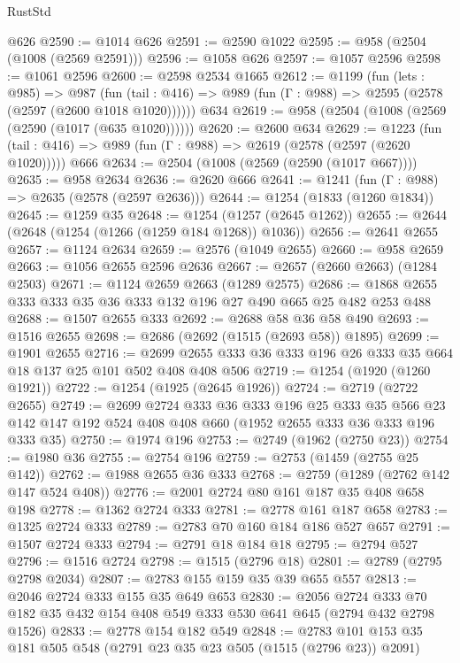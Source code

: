 \begin{lexlean}{RustStd}
\begin{coremodule}
    @626
@2590 := @1014 @626
@2591 := @2590 @1022
@2595 := @958 (@2504 (@1008 (@2569 @2591)))
@2596 := @1058 @626
@2597 := @1057 @2596
@2598 := @1061 @2596
@2600 := @2598 @2534 @1665
@2612 := @1199
    (fun (lets : @985) =>
    @987 (fun (tail : @416) => @989 (fun (Γ : @988) => @2595 (@2578 (@2597 (@2600 @1018 @1020))))))
    @634
@2619 := @958 (@2504 (@1008 (@2569 (@2590 (@1017 (@635 @1020))))))
@2620 := @2600 @634
@2629 := @1223
    (fun (tail : @416) => @989 (fun (Γ : @988) => @2619 (@2578 (@2597 (@2620 @1020)))))
    @666
@2634 := @2504 (@1008 (@2569 (@2590 (@1017 @667))))
@2635 := @958 @2634
@2636 := @2620 @666
@2641 := @1241 (fun (Γ : @988) => @2635 (@2578 (@2597 @2636)))
@2644 := @1254 (@1833 (@1260 @1834))
@2645 := @1259 @35
@2648 := @1254 (@1257 (@2645 @1262))
@2655 := @2644 (@2648 (@1254 (@1266 (@1259 @184 @1268)) @1036))
@2656 := @2641 @2655
@2657 := @1124 @2634
@2659 := @2576 (@1049 @2655)
@2660 := @958 @2659
@2663 := @1056 @2655 @2596 @2636
@2667 := @2657 (@2660 @2663) (@1284 @2503)
@2671 := @1124 @2659 @2663 (@1289 @2575)
@2686 := @1868 @2655 @333 @333 @35 @36 @333 @132 @196 @27 @490 @665 @25 @482 @253 @488
@2688 := @1507 @2655 @333
@2692 := @2688 @58 @36 @58 @490
@2693 := @1516 @2655
@2698 := @2686 (@2692 (@1515 (@2693 @58)) @1895)
@2699 := @1901 @2655
@2716 := @2699 @2655 @333 @36 @333 @196 @26 @333 @35 @664 @18 @137 @25 @101 @502 @408 @408 @506
@2719 := @1254 (@1920 (@1260 @1921))
@2722 := @1254 (@1925 (@2645 @1926))
@2724 := @2719 (@2722 @2655)
@2749 := @2699
    @2724
    @333
    @36
    @333
    @196
    @25
    @333
    @35
    @566
    @23
    @142
    @147
    @192
    @524
    @408
    @408
    @660
    (@1952 @2655 @333 @36 @333 @196 @333 @35)
@2750 := @1974 @196
@2753 := @2749 (@1962 (@2750 @23))
@2754 := @1980 @36
@2755 := @2754 @196
@2759 := @2753 (@1459 (@2755 @25 @142))
@2762 := @1988 @2655 @36 @333
@2768 := @2759 (@1289 (@2762 @142 @147 @524 @408))
@2776 := @2001 @2724 @80 @161 @187 @35 @408 @658 @198
@2778 := @1362 @2724 @333
@2781 := @2778 @161 @187 @658
@2783 := @1325 @2724 @333
@2789 := @2783 @70 @160 @184 @186 @527 @657
@2791 := @1507 @2724 @333
@2794 := @2791 @18 @184 @18
@2795 := @2794 @527
@2796 := @1516 @2724
@2798 := @1515 (@2796 @18)
@2801 := @2789 (@2795 @2798 @2034)
@2807 := @2783 @155 @159 @35 @39 @655 @557
@2813 := @2046 @2724 @333 @155 @35 @649 @653
@2830 := @2056
    @2724
    @333
    @70
    @182
    @35
    @432
    @154
    @408
    @549
    @333
    @530
    @641
    @645
    (@2794 @432 @2798 @1526)
@2833 := @2778 @154 @182 @549
@2848 := @2783 @101 @153 @35 @181 @505 @548 (@2791 @23 @35 @23 @505 (@1515 (@2796 @23)) @2091)

\end{coremodule}
\end{lexlean}
